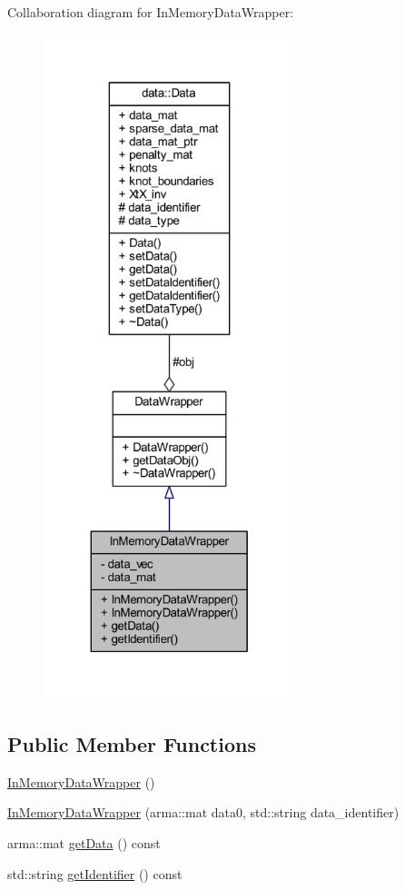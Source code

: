 Collaboration diagram for In\+Memory\+Data\+Wrapper\+:\nopagebreak
\begin{figure}[H]
\begin{center}
\leavevmode
\includegraphics[height=550pt]{class_in_memory_data_wrapper__coll__graph}
\end{center}
\end{figure}
\subsection*{Public Member Functions}
\begin{DoxyCompactItemize}
\item 
\mbox{\hyperlink{class_in_memory_data_wrapper_a091dd35c773aed960bc9ea9e95f7ae5b}{In\+Memory\+Data\+Wrapper}} ()
\item 
\mbox{\hyperlink{class_in_memory_data_wrapper_a0b3a3299fa46c88dc807e858c2f67a1f}{In\+Memory\+Data\+Wrapper}} (arma\+::mat data0, std\+::string data\+\_\+identifier)
\item 
arma\+::mat \mbox{\hyperlink{class_in_memory_data_wrapper_a69c754048807d42d8178914e8339a808}{get\+Data}} () const
\item 
std\+::string \mbox{\hyperlink{class_in_memory_data_wrapper_a2a81d397debd1c568f638004090cbdef}{get\+Identifier}} () const
\end{DoxyCompactItemize}
